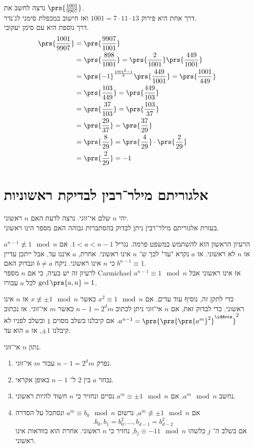\documentclass[a4paper,10pt,twoside,openany]{book}
\begin{document}
\begin{example}
נרצה לחשב את
$\prs{\frac{1001}{9907}}$.\\
דרך אחת היא פירוק
$1001 = 7 \cdot 11 \cdot 13$
ואז חישוב כמכפלת סימני לג'נדר.
\\
דרך נוספת היא עם סימן יעקובי.
\begin{align*}
\prs{\frac{1001}{9907}} &= \prs{\frac{9907}{1001}} \\&= \prs{\frac{898}{1001}} =
\prs{\frac{2}{1001}}\prs{\frac{449}{1001}} \\&=
\prs{-1}^{\frac{1001^2 - 1}{8}} \prs{\frac{449}{1001}} =
\prs{\frac{1001}{449}} \\&=
\prs{\frac{103}{449}} =
\prs{\frac{449}{103}} \\&=
\prs{\frac{37}{103}} =
\prs{\frac{103}{37}} \\&=
\prs{\frac{29}{37}} =
\prs{\frac{37}{29}} \\&=
\prs{\frac{8}{29}} = \prs{\frac{4}{29}} \cdot \prs{\frac{2}{29}}\\&=
\prs{\frac{2}{29}} = - 1
\end{align*}
\end{example}

\section{אלגוריתם מילר־רבין לבדיקת ראשוניות}

יהי
$n$
שלם אי־זוגי. נרצה לדעת האם
$n$
ראשוני.\\
בעזרת אלגוריתם מילר־רבין ניתן לבדוק בהסתברות גבוהה האם מספר הינו ראשוני.

הרעיון הראשון הוא להשתמש במשפט פרמה.
נגריל
$1 < a < n-1$.
אם
$a^{n-1} \not\equiv 1 \mod{n}$
אז
$n$
לא ראשוני.
אז
$a$
נקרא "עד" לכך ש־%
$n$
אינו ראשוני.
אחרת,
$a$
איננו עד, אבל ייתכן עדיין כי
$n$
אינו ראשוני.
ניקח
$b \neq a$
ונבדוק האם
$b^{n-1} \equiv 1$.\\
לרעיון זה יש בעיה, כי אם
$n$
מספר
\textenglish{Carmichael}
אז אינו ראשוני אבל
$a^{n-1} \equiv 1 \mod{n}$
לכל
$a$
עבורו
$\gcd\prs{a,n} = 1$.

כדי לתקן זה, נוסיף עוד עדים. אם
$x^2 \equiv 1 \mod{n}$
כאשר
$x \not\equiv \pm 1 \mod{n}$
אז
$n$
אינו ראשוני.
כדי לבדוק זאת, אם
$n$
אי־זוגי ניתן לכתוב
$n-1 = 2^d m$
כאשר
$m$
אי־זוגי. אז נכתוב
$a^{n-1} = \prs{\prs{\prs{a^m}^2}^{\iddots}}^2$.
אם קיבלנו בשלב מסוים
$1$
ובשלב לפניו לא קיבלנו
$\pm 1$,
אז
$a$
הוא עד.

\begin{algorithm}
נתון
$n$
אי־זוגי.
\begin{enumerate}
\item נפרק
$n-1 = 2^d m$
עבור
$m$
אי־זוגי.
\item נבחר
$a$
בין
$2$
ל־%
$n-1$
באופן אקראי.
\item נחשב
$a^m \mod {n}$.
אם
$a^m \equiv \pm 1 \mod{n}$
נסיים ונחזיר כי
$n$
חשוד להיות ראשוני.
\item אם
$a^m \not\equiv \pm 1 \mod{n}$,
נרשום
$a^m \equiv b_0 \mod{n}$
ונסתכל על הסדרה
\[\text{.} b_0, b_1 = b_0^2 , \ldots , b_{d-1} = b_{d-2}^2\]
אם בשלב ה־
$j$
כלשהו
$b_j \equiv -11 \mod{n}$,
נחזיר כי
$n$
ראשוני. אחרת הוא בוודאות אינו ראשוני.
\end{enumerate}
\end{algorithm}
\end{document}
